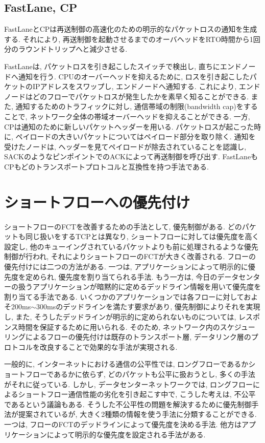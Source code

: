 \subsection{FastLane, CP}
FastLane\cite{fastlane}とCP\cite{cp}は再送制御の高速化のための明示的なパケットロスの通知を生成する. 
それにより, 再送制御を起動させるまでのオーバヘッドをRTO時間から1回分のラウンドトリップへと減少させる. 

FastLane\cite{fastlane}は, パケットロスを引き起こしたスイッチで検出し, 直ちにエンドノードへ通知を行う. 
CPUのオーバーヘッドを抑えるために, ロスを引き起こしたパケットのIPアドレスをスワップし, エンドノードへ通知する. 
これにより, エンドノードはどのフローでパケットロスが発生したかを素早く知ることができる. 
また, 通知するためのトラフィックに対し, 通信帯域の制限(bandwidth cap)をすることで,
ネットワーク全体の帯域オーバーヘッドを抑えることができる. 
一方, CP\cite{cp}は通知のために新しいパケットヘッダーを用いる. 
パケットロスが起こった時に, ペイロードの大きいパケットについてはペイロード部分を取り除く. 
通知を受けたノードは, ヘッダーを見てペイロードが除去されていることを認識し, 
SACKのようなピンポイントでのACKによって再送制御を呼び出す. 
FastLaneもCPもどのトランスポートプロトコルと互換性を持つ手法である. 

\section{ショートフローへの優先付け}
ショートフローのFCTを改善するための手法として, 優先制御がある. 
どのパケットも同じ扱いをするTCPとは異なり, ショートフローに対しては優先度を高く設定し,
他のキューイングされているパケットよりも前に処理されるような優先制御が行われ, それによりショートフローのFCTが大きく改善される. 
フローの優先付けには二つの方法がある. 
一つは, アプリケーションによって明示的に優先度を定められ, 優先度を割り当てられる手法\cite{p_fab, detail}. 
もう一方は, 今日のデータセンターの扱うアプリケーションが暗黙的に定めるデッドライン情報を用いて優先度を割り当てる手法である. 
いくつかのアプリケーションでは各フローに対しておよそ200ms$\sim$300msのデッドラインを満たす要求があり, 優先制御によりそれを実現し, 
また, そうしたデッドラインが明示的に定められないものについては, レスポンス時間を保証するために用いられる\cite{mcp, pdq, d2tcp, d3}.
そのため, ネットワーク内のスケジューリングによるフローの優先付けは既存のトランスポート層,
データリンク層のプロトコルを改良することで効果的な手法が実現される. 

一般的に, インターネットにおける通信の公平性では, ロングフローであるかショートフローであるかに依らず, どのパケットも公平に扱おうとし,
多くの手法がそれに従っている. 
しかし, データセンターネットワークでは, ロングフローによるショートフロー通信性能の劣化を引き起こす中で,
こうした考えは, 不公平であるという議論もある\cite{mcp, pdq, d2tcp, d3}.
そうした不公平性の問題を解決するために優先制御手法が提案されているが, 大きく2種類の情報を使う手法に分類することができる. 
一つは, フローのFCTのデッドラインによって優先度を決める手法. 
他方はアプリケーションによって明示的な優先度を設定される手法がある. 

